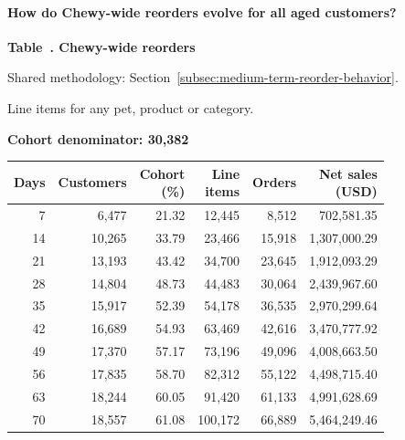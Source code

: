 \begin{landscape}
\paragraph{How do Chewy-wide reorders evolve for all aged customers?}

\label{tab:financial-opportunity-reorder-all-chewy}
\par\smallskip\noindent\parbox[t][2\baselineskip][t]{\linewidth}{\raggedright\textbf{Table~\thetable. Chewy-wide reorders}}
\par\raggedright\footnotesize Shared methodology: Section~\ref{subsec:medium-term-reorder-behavior}.
\par\noindent\parbox[t][2\baselineskip][t]{\linewidth}{\raggedright Line items for any pet, product or category.}
\par\noindent\textbf{Cohort denominator: 30,382}
\par\centering\footnotesize
\setlength{\tabcolsep}{2pt}
\begin{tabular}{rrrrrr}\toprule
Days & Customers & \shortstack{Cohort\\(\%)} & \shortstack{Line\\items} & Orders & \shortstack{Net sales\\(USD)} \\ \midrule

7 & 6,477 & 21.32 & 12,445 & 8,512 & 702,581.35 \\

14 & 10,265 & 33.79 & 23,466 & 15,918 & 1,307,000.29 \\

21 & 13,193 & 43.42 & 34,700 & 23,645 & 1,912,093.29 \\

28 & 14,804 & 48.73 & 44,483 & 30,064 & 2,439,967.60 \\

35 & 15,917 & 52.39 & 54,178 & 36,535 & 2,970,299.64 \\

42 & 16,689 & 54.93 & 63,469 & 42,616 & 3,470,777.92 \\

49 & 17,370 & 57.17 & 73,196 & 49,096 & 4,008,663.50 \\

56 & 17,835 & 58.70 & 82,312 & 55,122 & 4,498,715.40 \\

63 & 18,244 & 60.05 & 91,420 & 61,133 & 4,991,628.69 \\

70 & 18,557 & 61.08 & 100,172 & 66,889 & 5,464,249.46 \\
\bottomrule\end{tabular}\par

\end{landscape}

